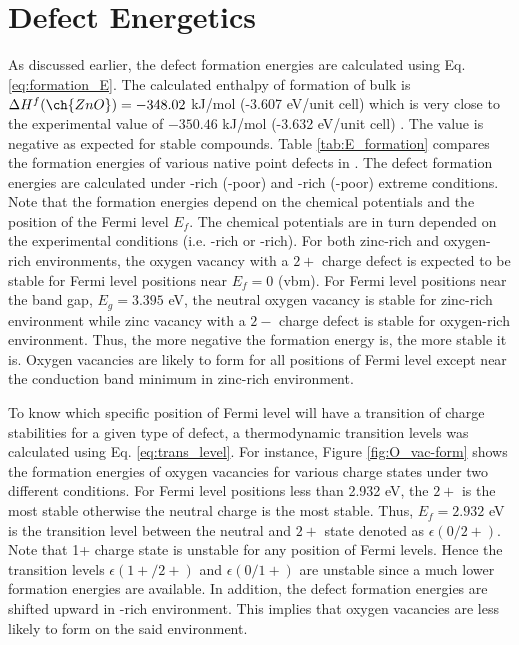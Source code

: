 \clearpage

\section{Defect Energetics}
As discussed earlier, the defect formation energies are calculated using Eq.  \eqref{eq:formation_E}. The calculated enthalpy of formation of bulk  is $\Delta H^f (\ch{ZnO}) = -348.02$ kJ/mol (-3.607 eV/unit cell) which is very close to the experimental value of $-350.46$ kJ/mol (-3.632 eV/unit cell) \citep{Medvedev1989}. The value is negative as expected for stable compounds. Table \ref{tab:E_formation} compares the formation energies of various native point defects in . The defect formation energies are calculated under  -rich (-poor) and -rich (-poor) extreme conditions. Note that the formation energies depend on the chemical potentials and the position of the Fermi level $E_f$. The chemical potentials are in turn depended on the experimental conditions (i.e. -rich or -rich). For both zinc-rich and oxygen-rich environments, the oxygen vacancy with a $2+$ charge defect is expected to be stable for Fermi level positions near $E_f = 0$ (vbm). For Fermi level positions near the band gap, $E_g = 3.395$ eV, the neutral oxygen vacancy is stable for zinc-rich environment while zinc vacancy with a $2-$ charge defect is stable for oxygen-rich environment. Thus, the more negative the formation energy is, the more stable it is. Oxygen vacancies are likely to form for all positions of Fermi level except near the conduction band minimum in zinc-rich environment.

To know which specific position of Fermi level will have a transition of charge stabilities for a given type of defect, a thermodynamic transition levels was calculated using Eq. \eqref{eq:trans_level}. For instance, Figure \ref{fig:O_vac-form} shows the formation energies of oxygen vacancies for various charge states under two different conditions. For Fermi level positions less than 2.932 eV, the $2+$ is the most stable otherwise the neutral charge is the most stable. Thus, $E_f = 2.932$ eV is the transition level between the neutral and $2+$ state denoted as $\epsilon(0/2+)$. Note that 1+ charge state is unstable for any position of Fermi levels. Hence the transition levels $\epsilon(1+/2+)$ and $\epsilon(0/1+)$ are unstable since a much lower formation energies are available. In addition, the defect formation energies are shifted upward in -rich environment. This implies that oxygen vacancies are less likely to form on the said environment.

